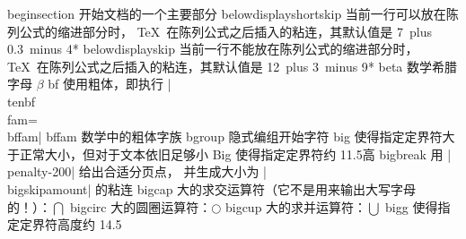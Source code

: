 \capcs beginsection {开始文档的一个主要部分}{}{\@beginsection}
\capcs belowdisplayshortskip {当前一行可以放在陈列公式的缩进部分时，
\TeX\ 在陈列公式之后插入的粘连，其默认值是 7\pt\ plus 0.3\pt\ minus 4\pt}*{}
\capcs belowdisplayskip {当前一行不能放在陈列公式的缩进部分时，
\TeX\ 在陈列公式之后插入的粘连，其默认值是  12\pt\ plus 3\pt\ minus 9\pt}*{}
\capcs beta {数学希腊字母 $\beta$}{}{}
\capcs bf {使用粗体，即执行 |\\tenbf\\fam=\\bffam|}{}{}
\capcs bffam {数学中的粗体字族}{}{}
\capcs bgroup {隐式编组开始字符}{}{}
\capcs big {使得指定定界符大于正常大小，但对于文本依旧足够小}{}{}
\capcs Big {使得指定定界符约 11.5\pt 高}{}{}
\capcs bigbreak {用 |\\penalty-200| 给出合适分页点，
    并生成大小为 |\\bigskipamount| 的粘连}{}{}
\capcs bigcap {大的求交运算符（它不是用来输出大写字母的！）：$\bigcap$}{}{}
\capcs bigcirc {大的圆圈运算符：$\bigcirc$}{}{}
\capcs bigcup {大的求并运算符：$\bigcup$}{}{}
\capcs bigg {使得指定定界符高度约 14.5\pt}{}{}
